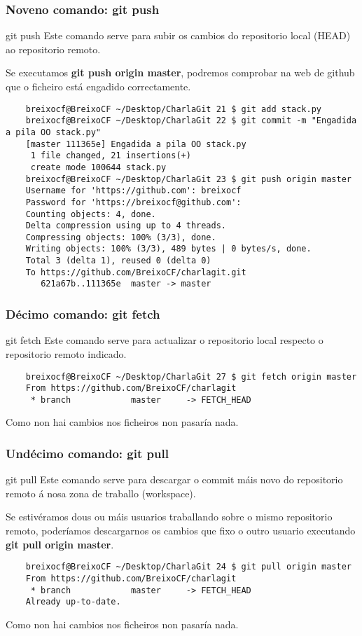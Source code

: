 \begin{frame}[fragile]
  \frametitle{Noveno comando: git push}
  \begin{block}{git push}
    Este comando serve para subir os cambios do repositorio local (HEAD) ao repositorio remoto.
  \end{block}
  \scriptsize
  Se executamos \textbf{git push origin master}, podremos comprobar na web de github que o ficheiro está engadido correctamente.
  \tiny 
\begin{verbatim}
	breixocf@BreixoCF ~/Desktop/CharlaGit 21 $ git add stack.py 
	breixocf@BreixoCF ~/Desktop/CharlaGit 22 $ git commit -m "Engadida a pila OO stack.py"
	[master 111365e] Engadida a pila OO stack.py
	 1 file changed, 21 insertions(+)
	 create mode 100644 stack.py
	breixocf@BreixoCF ~/Desktop/CharlaGit 23 $ git push origin master 
	Username for 'https://github.com': breixocf
	Password for 'https://breixocf@github.com': 
	Counting objects: 4, done.
	Delta compression using up to 4 threads.
	Compressing objects: 100% (3/3), done.
	Writing objects: 100% (3/3), 489 bytes | 0 bytes/s, done.
	Total 3 (delta 1), reused 0 (delta 0)
	To https://github.com/BreixoCF/charlagit.git
	   621a67b..111365e  master -> master
\end{verbatim}
\end{frame}

\begin{frame}[fragile]
  \frametitle{Décimo comando: git fetch}
  \begin{block}{git fetch}
    Este comando serve para actualizar o repositorio local respecto o repositorio remoto indicado.
  \end{block}
  \scriptsize
\begin{verbatim}
	breixocf@BreixoCF ~/Desktop/CharlaGit 27 $ git fetch origin master
	From https://github.com/BreixoCF/charlagit
	 * branch            master     -> FETCH_HEAD
\end{verbatim}
  Como non hai cambios nos ficheiros non pasaría nada.
\end{frame}


\begin{frame}[fragile]
  \frametitle{Undécimo comando: git pull}
  \begin{block}{git pull}
    Este comando serve para descargar o commit máis novo do repositorio remoto á nosa zona de traballo (workspace).
  \end{block}
  \scriptsize
  Se estivéramos dous ou máis usuarios traballando sobre o mismo repositorio remoto, poderíamos descargarnos os cambios que fixo o outro usuario executando \textbf{git pull origin master}.
  \tiny 
\begin{verbatim}
	breixocf@BreixoCF ~/Desktop/CharlaGit 24 $ git pull origin master 
	From https://github.com/BreixoCF/charlagit
	 * branch            master     -> FETCH_HEAD
	Already up-to-date.
\end{verbatim}
  Como non hai cambios nos ficheiros non pasaría nada.
\end{frame}


